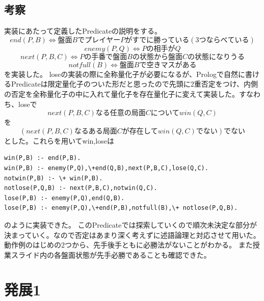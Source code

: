 \documentclass[11pt,a4paper]{jsarticle}
\begin{document}
\subsection*{考察}
実装にあたって定義したPredicateの説明をする。
$$end(P,B) \Leftrightarrow 盤面BでプレイヤーPがすでに勝っている(3つならべている)$$ 
$$enemy(P,Q) \Leftrightarrow Pの相手がQ$$
$$next(P,B,C) \Leftrightarrow Pの手番で盤面Bの状態から盤面Cの状態になりうる$$
$$notfull(B) \Leftrightarrow 盤面Bで空きマスがある$$
を実装した。
loseの実装の際に全称量化子が必要になるが、Prologで自然に書けるPredicateは限定量化子のついた形だと思ったので先頭に2重否定をつけ、内側の否定を全称量化子の中に入れて量化子を存在量化子に変えて実装した。すなわち、loseで
$$next(P,B,C)なる任意の局面Cについてwin(Q,C)$$
を
$$(next(P,B,C)なるある局面Cが存在してwin(Q,C)でない)でない$$
とした。これらを用いてwin,loseは
\begin{lstlisting}[basicstyle=\ttfamily\footnotesize, frame=single]
win(P,B) :- end(P,B).
win(P,B) :- enemy(P,Q),\+end(Q,B),next(P,B,C),lose(Q,C).
notwin(P,B) :- \+ win(P,B).
notlose(P,Q,B) :- next(P,B,C),notwin(Q,C).
lose(P,B) :- enemy(P,Q),end(Q,B).
lose(P,B) :- enemy(P,Q),\+end(P,B),notfull(B),\+ notlose(P,Q,B).
\end{lstlisting}
のように実装できた。
このPredicateでは探索していくので順次未決定な部分が決まっていく。なので否定はあまり深く考えずに述語論理と対応させて用いた。
動作例のはじめの2つから、先手後手ともに必勝法がないことがわかる。
また授業スライド内の各盤面状態が先手必勝であることも確認できた。
\section*{発展1}
\end{document}
